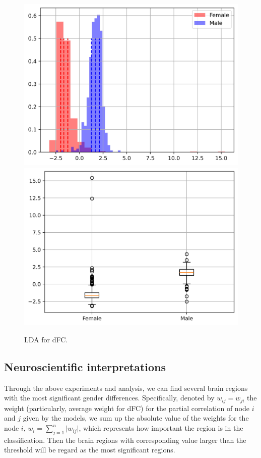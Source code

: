 \documentclass[11pt]{article}
\begin{document}
\begin{figure}[H]
{\begin{minipage}[b]{0.3\textwidth}
            \includegraphics[width=1\textwidth]{../Analysis/LDA/node=50_size=480_step=180_rho=0.1/hist.jpg}
            \includegraphics[width=1\textwidth]{../Analysis/LDA/node=50_size=480_step=180_rho=0.1/box.jpg}
        \end{minipage}
    }
    \caption{LDA for dFC.}
    \label{LDA-example-dfc}
\end{figure}

\subsection{Neuroscientiﬁc interpretations}

Through the above experiments and analysis, we can find several brain regions with the most significant gender differences. Specifically, denoted by $w_{ij} = w_{ji}$ the weight (particularly, average weight for dFC) for the partial correlation of node $i$ and $j$ given by the models, we sum up the absolute value of the weights for the node $i$, $w_i = \sum_{j=1}^{n} \vert w_{ij} \vert$, which represents how important the region is in the classification. Then the brain regions with corresponding value larger than the threshold will be regard as the most significant regions.
\end{document}
